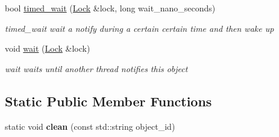 \begin{DoxyCompactItemize}
bool \hyperlink{classshared__memory_1_1ConditionVariable_af7b1ce584ff9ef9a0925f57cae8e6263}{timed\+\_\+wait} (\hyperlink{classshared__memory_1_1Lock}{Lock} \&lock, long wait\+\_\+nano\+\_\+seconds)
\begin{DoxyCompactList}\small\item\em timed\+\_\+wait wait a notify during a certain certain time and then wake up \end{DoxyCompactList}\item 
\mbox{\label{classshared__memory_1_1ConditionVariable_a8746faccdf81b03dd36c5b405c9ab48d}} 
void \hyperlink{classshared__memory_1_1ConditionVariable_a8746faccdf81b03dd36c5b405c9ab48d}{wait} (\hyperlink{classshared__memory_1_1Lock}{Lock} \&lock)
\begin{DoxyCompactList}\small\item\em wait waits until another thread notifies this object \end{DoxyCompactList}\end{DoxyCompactItemize}
\subsection*{Static Public Member Functions}
\begin{DoxyCompactItemize}
\item 
\mbox{\label{classshared__memory_1_1ConditionVariable_adf6a90466c2bf96cbc08f3ba0246274e}} 
static void {\bfseries clean} (const std\+::string object\+\_\+id)
\end{DoxyCompactItemize}
